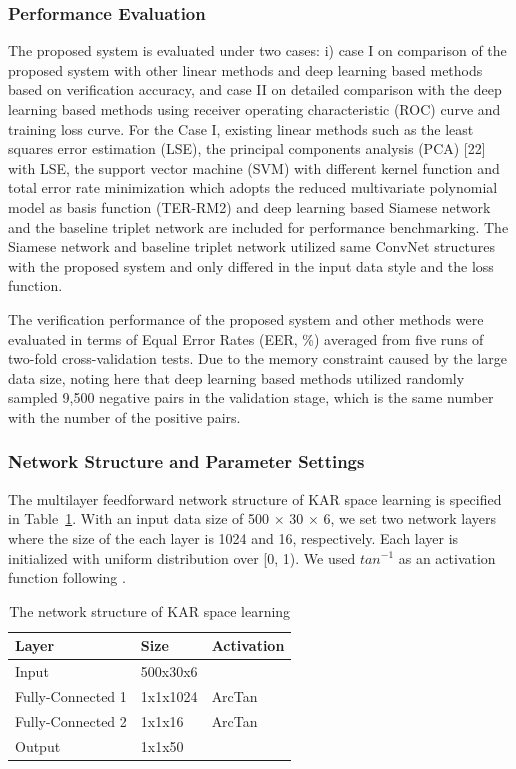 \documentclass[runningheads]{llncs}
\begin{document}
\subsubsection{Performance Evaluation}
The proposed system is evaluated under two cases: i) case I on comparison of the proposed system with other linear methods and deep learning based methods based on verification accuracy, and case II on detailed comparison with the deep learning based methods using receiver operating characteristic (ROC) curve and training loss curve. For the Case I, existing linear methods such as the least squares error estimation (LSE), the principal components analysis (PCA) [22] with LSE, the support vector machine (SVM) with different kernel function and total error rate minimization which adopts the reduced multivariate polynomial model as basis function (TER-RM2) \cite{toh2003fingerprint,toh2008between} and deep learning based Siamese network \cite{koch2015siamese} and the baseline triplet network \cite{hoffer2015deep} are included for performance benchmarking. The Siamese network and baseline triplet network utilized same ConvNet structures with the proposed system and only differed in the input data style and the loss function.

The verification performance of the proposed system and other methods were evaluated in terms of Equal Error Rates (EER, \%) averaged from five runs of two-fold cross-validation tests. Due to the memory constraint caused by the large data size, noting here that deep learning based methods utilized randomly sampled 9,500 negative pairs in the validation stage, which is the same number with the number of the positive pairs.

\subsubsection{Network Structure and Parameter Settings}
The multilayer feedforward network structure of KAR space learning is specified in Table~\ref{tab2}. With an input data size of 500 $\times$ 30 $\times$ 6, we set two network layers where the size of the each layer is 1024 and 16, respectively. Each layer is initialized with uniform distribution over [0, 1). We used ${tan}^{-1}$ as an activation function following \cite{toh2018analytic}.

\begin{table}[]
    \caption{The network structure of KAR space learning}\label{tab2}
    \centering
    \begin{tabular}{|l|l|l|}
    \hline
    Layer   & Size     & Activation \\ \hline
    Input   & 500x30x6 &            \\
    Fully-Connected 1 & 1x1x1024 & ArcTan     \\
    Fully-Connected 2 & 1x1x16  & ArcTan     \\
    Output  & 1x1x50   &            \\ \hline
    \end{tabular}
\end{table}
\end{document}
